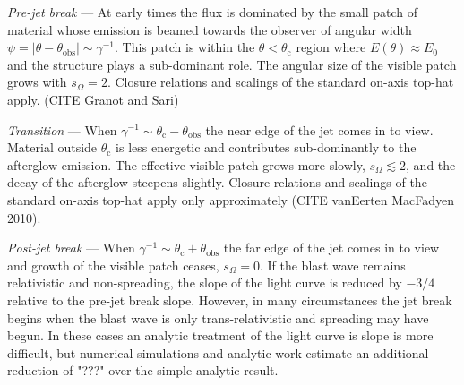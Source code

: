 \documentclass[twocolumn]{aastex62}
\newcommand{\thobs}{\ensuremath{\theta_{\mathrm{obs}}}}
\newcommand{\thC}{\ensuremath{\theta_{\mathrm{c}}}}
\newcommand{\som}{\ensuremath{s_{\Omega}}}
\begin{document}
\emph{Pre-jet break} ---  At early times the flux is dominated by the small patch of material whose emission is beamed towards the observer of angular width $\psi = |\theta-\thobs| \sim \gamma^{-1}$.  This patch is within the $\theta < \thC$ region where $E(\theta) \approx E_0$ and the structure plays a sub-dominant role.  The angular size of the visible patch grows with $\som = 2$.  Closure relations and scalings of the standard on-axis top-hat apply. (CITE Granot and Sari)

\emph{Transition} ---  When $\gamma^{-1} \sim \thC-\thobs$ the near edge of the jet comes in to view.  Material outside $\thC$ is less energetic and contributes sub-dominantly to the afterglow emission.  The effective visible patch grows more slowly, $\som \lesssim 2$, and the decay of the afterglow steepens slightly. Closure relations and scalings of the standard on-axis top-hat apply only approximately (CITE vanEerten MacFadyen 2010).  

\emph{Post-jet break} ---  When $\gamma^{-1} \sim \thC+\thobs$ the far edge of the jet comes in to view and growth of the visible patch ceases, $\som = 0$.  If the blast wave remains relativistic and non-spreading, the slope of the light curve is reduced by $-3/4$ relative to the pre-jet break slope.  However, in many circumstances the jet break begins when the blast wave is only trans-relativistic and spreading may have begun.  In these cases an analytic treatment of the light curve is slope is more difficult, but numerical simulations and analytic work estimate an additional reduction of "???" over the simple analytic result.
\end{document}
